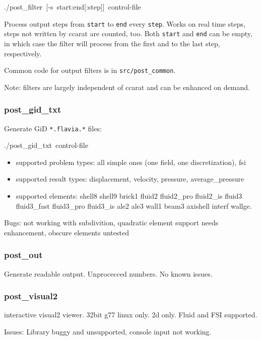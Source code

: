\begin{lyxcode}
./post\_filter~{[}-s~start:end{[}:step]]~control-file
\end{lyxcode}
Process output steps from \texttt{start} to \texttt{end} every \texttt{step}.
Works on real time steps, steps not written by ccarat are counted,
too. Both \texttt{start} and \texttt{end} can be empty, in which case
the filter will process from the first and to the last step, respectively.

Common code for output filters is in \texttt{src/post\_common}.

Note: filters are largely independent of ccarat and can be enhanced
on demand.


\subsubsection{post\_gid\_txt}

Generate GiD \texttt{{*}.flavia.{*}} files:

\begin{lyxcode}
./post\_gid\_txt~control-file
\end{lyxcode}
\begin{itemize}
\item supported problem types: all simple ones (one field, one discretization),
fsi
\item supported result types: displacement, velocity, pressure, average\_pressure
\item supported elements: shell8 shell9 brick1 fluid2 fluid2\_pro fluid2\_is
fluid3 fluid3\_fast fluid3\_pro fluid3\_is ale2 ale3 wall1 beam3 axishell
interf wallge.
\end{itemize}
Bugs: not working with subdivition, quadratic element support needs
enhancement, obscure elements untested


\subsubsection{post\_out}

Generate readable output. Unprocecced numbers. No known issues.


\subsubsection{post\_visual2}

interactive visual2 viewer. 32bit g77 linux only. 2d only. Fluid and
FSI supported.

Issues: Library buggy and unsupported, console input not working.


